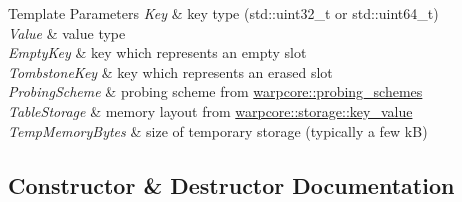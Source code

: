 \begin{DoxyTemplParams}{Template Parameters}
{\em Key} & key type ({\ttfamily std\+::uint32\+\_\+t} or {\ttfamily std\+::uint64\+\_\+t}) \\
\hline
{\em Value} & value type \\
\hline
{\em Empty\+Key} & key which represents an empty slot \\
\hline
{\em Tombstone\+Key} & key which represents an erased slot \\
\hline
{\em Probing\+Scheme} & probing scheme from {\ttfamily \hyperlink{namespacewarpcore_1_1probing__schemes}{warpcore\+::probing\+\_\+schemes}} \\
\hline
{\em Table\+Storage} & memory layout from {\ttfamily \hyperlink{namespacewarpcore_1_1storage_1_1key__value}{warpcore\+::storage\+::key\+\_\+value}} \\
\hline
{\em Temp\+Memory\+Bytes} & size of temporary storage (typically a few kB) \\
\hline
\end{DoxyTemplParams}


\subsection{Constructor \& Destructor Documentation}
\mbox{\label{classwarpcore_1_1SingleValueHashTable_a126bd7d04488b3abeb1b230bd04963b2}} 
